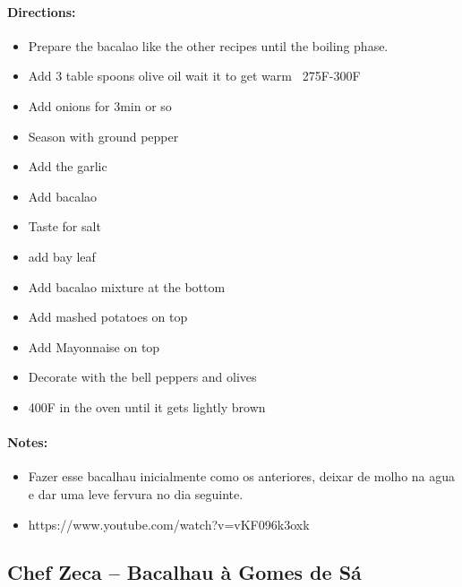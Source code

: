 \documentclass{article}
\begin{document}
\paragraph{Directions:}
\begin{itemize}
    \item Prepare the bacalao like the other recipes until the boiling phase.
    \item Add 3 table spoons olive oil wait it to get warm ~275F-300F
    \item Add onions for 3min or so
    \item Season with ground pepper
    \item Add the garlic
    \item Add bacalao
    \item Taste for salt
    \item add bay leaf
    \item Add bacalao mixture at the bottom
    \item Add mashed potatoes on top
    \item Add Mayonnaise on top
    \item Decorate with the bell peppers and olives
    \item 400F in the oven until it gets lightly brown
\end{itemize}

\paragraph{Notes:}
\begin{itemize}
    \item Fazer esse bacalhau inicialmente como os anteriores, deixar de molho na agua e dar uma leve fervura no dia seguinte.
    \item https://www.youtube.com/watch?v=vKF096k3oxk
\end{itemize}

\subsection{Chef Zeca – Bacalhau à Gomes de Sá}
\end{document}
